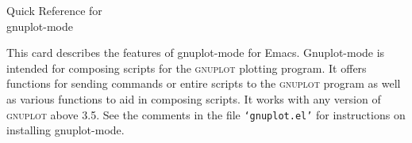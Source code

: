 \documentclass[twocolumn]{article}
\newenvironment{Boxedminipage}%
{\begin{Sbox}\begin{minipage}}%
  {\end{minipage}\end{Sbox}\Ovalbox{\TheSbox}}
\def\file#1{{\texttt{`#1'}}}
\begin{document}
\small

\thispagestyle{empty}

\begin{center}
  \begin{Boxedminipage}{0.75\linewidth}
    \begin{center}
      \vspace{0.01\textheight}
      {\Large Quick Reference for}\\
      \vspace{0.007\textheight}
      {\Large gnuplot-mode}
      \vspace{0.01\textheight}
    \end{center}
  \end{Boxedminipage}
\end{center}

\vspace{3ex}

This card describes the features of gnuplot-mode for Emacs.
Gnuplot-mode is intended for composing scripts for the
\textsc{gnuplot} plotting program.  It offers functions for sending
commands or entire scripts to the \textsc{gnuplot} program as well as
various functions to aid in composing scripts.  It works with any
version of \textsc{gnuplot} above 3.5.  See the comments in the
file \file{gnuplot.el} for instructions on installing gnuplot-mode.

\vspace{2ex}
\end{document}
